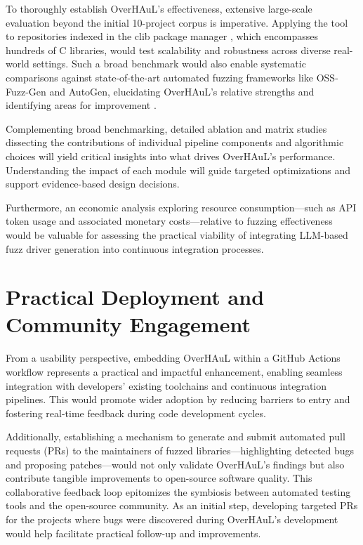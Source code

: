 \documentclass[
  a4paper,
]{scrreprt}
\theoremstyle{definition}
\theoremstyle{remark}
\begin{document}
To thoroughly establish OverHAuL's effectiveness, extensive large-scale
evaluation beyond the initial 10-project corpus is imperative. Applying
the tool to repositories indexed in the clib package manager
\autocite{clibs}, which encompasses hundreds of C libraries, would test
scalability and robustness across diverse real-world settings. Such a
broad benchmark would also enable systematic comparisons against
state-of-the-art automated fuzzing frameworks like OSS-Fuzz-Gen and
AutoGen, elucidating OverHAuL's relative strengths and identifying areas
for improvement \autocite{oss-fuzz-gen,sun2024}.

Complementing broad benchmarking, detailed ablation and matrix studies
dissecting the contributions of individual pipeline components and
algorithmic choices will yield critical insights into what drives
OverHAuL's performance. Understanding the impact of each module will
guide targeted optimizations and support evidence-based design
decisions.

Furthermore, an economic analysis exploring resource consumption---such
as API token usage and associated monetary costs---relative to fuzzing
effectiveness would be valuable for assessing the practical viability of
integrating LLM-based fuzz driver generation into continuous integration
processes.

\section{Practical Deployment and Community
Engagement}\label{practical-deployment-and-community-engagement}

From a usability perspective, embedding OverHAuL within a GitHub Actions
workflow represents a practical and impactful enhancement, enabling
seamless integration with developers' existing toolchains and continuous
integration pipelines. This would promote wider adoption by reducing
barriers to entry and fostering real-time feedback during code
development cycles.

Additionally, establishing a mechanism to generate and submit automated
pull requests (PRs) to the maintainers of fuzzed
libraries---highlighting detected bugs and proposing patches---would not
only validate OverHAuL's findings but also contribute tangible
improvements to open-source software quality. This collaborative
feedback loop epitomizes the symbiosis between automated testing tools
and the open-source community. As an initial step, developing targeted
PRs for the projects where bugs were discovered during OverHAuL's
development would help facilitate practical follow-up and improvements.
\end{document}
